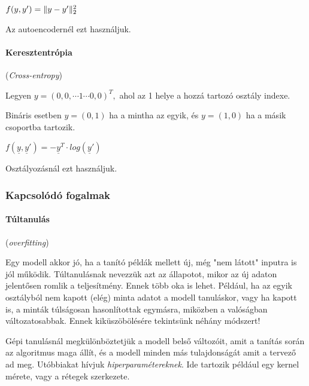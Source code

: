 $ f(y, y') = \lVert y - y'\rVert_2^2 $

\noindent
Az autoencodernél ezt használjuk.


\paragraph{Keresztentrópia} (\textit{Cross-entropy})

Legyen $ y = (0, 0, \cdots 1 \cdots 0, 0)^T, $ 
ahol az 1 helye a hozzá tartozó osztály indexe.

Bináris esetben $ y=(0, 1) $ ha a mintha az egyik, és
$ y=(1, 0) $ ha a másik csoportba tartozik.

$ f(\underline{y}, \underline{y}') = - \underline{y}^T \cdot log(\underline{y}') $

\noindent
Osztályozásnál ezt használjuk.



\subsubsection{Kapcsolódó fogalmak}


\paragraph{Túltanulás} (\textit{overfitting})


Egy modell akkor jó, ha a tanító példák mellett új, még "nem látott"
inputra is jól működik. Túltanulásnak nevezzük
azt az állapotot, mikor az új adaton jelentősen romlik a teljesítmény.
Ennek több oka is lehet. Például, ha az egyik osztályból nem kapott 
(elég) minta adatot a modell tanuláskor, vagy ha kapott is, a minták túlságosan 
hasonlítottak egymásra, miközben a valóságban változatosabbak.
Ennek kiküszöbölésére tekintsünk néhány módszert!




Gépi tanulásnál megkülönböztetjük a modell belső változóit, amit 
a tanítás során az algoritmus maga állít, és a modell minden más tulajdonságát
amit a tervező ad meg. Utóbbiakat hívjuk \textit{hiperparamétereknek}.
Ide tartozik például egy kernel mérete, vagy a rétegek szerkezete.


